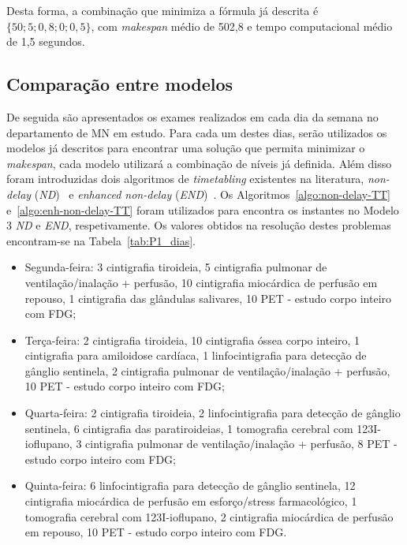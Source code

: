 Desta forma, a combinação que minimiza a fórmula já descrita é $\{50; 5; 0,8; 0; 0,5\}$, com \textit{makespan} médio de 502,8 e tempo computacional médio de 1,5 segundos.\\

\subsection{Comparação entre modelos}

De seguida são apresentados os exames realizados em cada dia da semana no departamento de MN em estudo. Para cada um destes dias, serão utilizados os modelos já descritos para encontrar uma solução que permita minimizar o \textit{makespan}, cada modelo utilizará a combinação de níveis já definida. Além disso foram introduzidas dois algoritmos de \textit{timetabling} existentes na literatura, \textit{non-delay} (\textit{ND})~\cite{schusterApproximativeProceduresNowait2003} e \textit{enhanced non-delay} (\textit{END})~\cite{framinanEnhancedTimetablingProcedure2006}. Os Algoritmos~\ref{algo:non-delay-TT} e~\ref{algo:enh-non-delay-TT} foram utilizados para encontra os instantes no Modelo 3 \textit{ND} e \textit{END}, respetivamente. Os valores obtidos na resolução destes problemas encontram-se na Tabela~\ref{tab:P1_dias}.\\

\begin{itemize}
\item Segunda-feira: 3 cintigrafia tiroideia, 5 cintigrafia pulmonar de ventilação/inalação + perfusão, 10 cintigrafia miocárdica de perfusão em repouso, 1 cintigrafia das glândulas salivares, 10 PET - estudo corpo inteiro com FDG;
\item Terça-feira: 2 cintigrafia tiroideia, 10 cintigrafia óssea corpo inteiro, 1 cintigrafia para amiloidose cardíaca, 1 linfocintigrafia para detecção de gânglio sentinela, 2 cintigrafia pulmonar de ventilação/inalação + perfusão, 10 PET - estudo corpo inteiro com FDG;
\item Quarta-feira: 2 cintigrafia tiroideia, 2 linfocintigrafia para detecção de gânglio sentinela, 6 cintigrafia das paratiroideias, 1 tomografia cerebral com 123I-ioflupano, 3 cintigrafia pulmonar de ventilação/inalação + perfusão, 8 PET - estudo corpo inteiro com FDG;
\item Quinta-feira: 6 linfocintigrafia para detecção de gânglio sentinela, 12 cintigrafia miocárdica de perfusão em esforço/stress farmacológico, 1 tomografia cerebral com 123I-ioflupano, 2 cintigrafia miocárdica de perfusão em repouso, 10 PET - estudo corpo inteiro com FDG.
\end{itemize}


